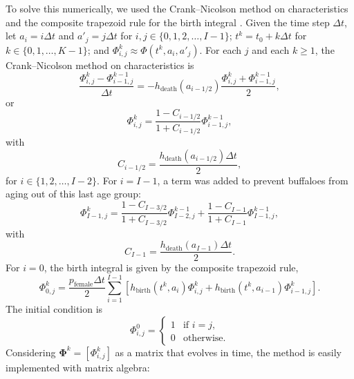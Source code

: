 \documentclass[12pt]{article}
\newcommand{\mat}[1]{\mathbf{#1}}
\begin{document}
To solve this numerically, we used the Crank--Nicolson method on
characteristics and the composite trapezoid rule for the birth
integral \autocite{milner_1992}.  Given the time step $\Delta t$,
let $a_i = i \Delta t$
and $a'_j = j \Delta t$
for $i, j \in \{0, 1, 2, \ldots, I - 1\}$;
$t^k = t_0 + k \Delta t$
for $k \in \{0, 1, \ldots, K - 1\}$;
and $\Phi_{i, j}^k \approx \Phi(t^k, a_i, a'_j)$.
For each $j$
and each $k \geq 1$, the Crank--Nicolson method on characteristics is
\begin{equation}
  \label{CN_step}
  \frac{\Phi_{i, j}^k - \Phi_{i - 1, j}^{k - 1}}{\Delta t}
  = - h_{\text{death}}(a_{i - 1 / 2})
  \frac{\Phi_{i, j}^k + \Phi_{i - 1, j}^{k - 1}}{2},
\end{equation}
or
\begin{equation}
  \Phi_{i, j}^k
  = \frac{1 - C_{i - 1 / 2}}{1 + C_{i - 1 / 2}}
  \Phi_{i - 1, j}^{k - 1},
\end{equation}
with
\begin{equation}
  C_{i - 1 / 2}
  = \frac{h_{\text{death}}(a_{i - 1 / 2}) \Delta t}{2},
\end{equation}
for $i \in \{1, 2, \ldots, I - 2\}$.  For $i = I - 1$,
a term was added to prevent buffaloes from aging out of this
last age group:
\begin{equation}
  \Phi_{I - 1, j}^k
  = \frac{1 - C_{I - 3 / 2}}{1 + C_{I - 3 / 2}}
  \Phi_{I - 2, j}^{k - 1}
  + \frac{1 - C_{I - 1}}{1 + C_{I - 1}}
  \Phi_{I - 1, j}^{k - 1},
\end{equation}
with
\begin{equation}
  C_{I - 1}
  = \frac{h_{\text{death}}(a_{I - 1}) \Delta t}{2}.
\end{equation}
For $i = 0$, the birth integral is given by the composite trapezoid rule,
\begin{equation}
  \label{birth_step}
  \Phi_{0, j}^k =
  \frac{p_{\text{female}} \Delta t}{2}
  \sum_{i = 1}^{I - 1}
  \left[h_{\text{birth}}(t^k, a_i) \Phi_{i, j}^k +
    h_{\text{birth}}(t^k, a_{i - 1}) \Phi_{i - 1, j}^k\right].
\end{equation}
The initial condition is
\begin{equation}
  \Phi_{i, j}^0 =
  \begin{cases}
    1 & \text{if $i = j$}, \\
    0 & \text{otherwise}.
  \end{cases}
\end{equation}
Considering $\mat{\Phi}^k = [\Phi_{i, j}^k]$ as a matrix that
evolves in time, the method is easily implemented with matrix algebra:
\end{document}
